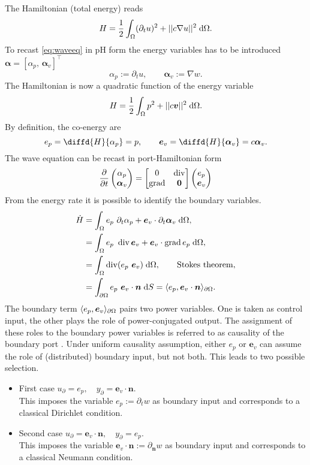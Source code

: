 The Hamiltonian (total energy) reads
\[
H = \frac{1}{2} \int_{\Omega} (\partial_t u)^2 + ||c \nabla u||^2 \d\Omega.
\]
To recast \eqref{eq:waveeq} in pH form the energy variables has to be introduced $\bm{\alpha} = [\alpha_p, \, \bm{\alpha}_v]^\top$
\[
\alpha_p := \partial_t u, \qquad \bm{\alpha}_v := \nabla w.
\] 
The Hamiltonian is now a quadratic function of the energy variable
\[
H = \frac{1}{2} \int_{\Omega} p^2 + ||c \bm{v}||^2  \d\Omega.
\]
By definition, the co-energy are 
\[
e_p = \diffd{H}{\alpha_p} = p, \qquad \bm{e}_v = \diffd{H}{\bm{\alpha}_v} = c\bm{\alpha}_v.
\]
The wave equation can be recast in port-Hamiltonian form
\[
\diffp{}{t}
\begin{pmatrix}
\alpha_p \\
\bm{\alpha}_v \\
\end{pmatrix} = 
\begin{bmatrix}
0 & \div \\
\grad & \bm{0}
\end{bmatrix}
\begin{pmatrix}
e_p \\
\bm{e}_v \\
\end{pmatrix}
\]
From the energy rate it is possible to identify the boundary variables. 
\begin{align*}
\dot{H} &= \int_{\Omega} e_p \ \partial_t \alpha_p + \bm{e}_v \cdot \partial_t \bm{\alpha}_v \d\Omega, \\
 &= \int_{\Omega} e_p \ \div \bm{e}_v + \bm{e}_v \cdot \grad e_p \d\Omega,  \\
 &= \int_{\Omega} \div(e_p \ \bm{e}_v) \d\Omega, \qquad \text{Stokes theorem}, \\
 &= \int_{\partial \Omega} e_p \ \bm{e}_v\cdot\bm{n} \d{S} = \inner[\partial\Omega]{e_p}{\bm{e}_v \cdot\bm{n}}.
\end{align*}
The boundary term $\inner[\partial\Omega]{e_p}{\bm{e}_v}$ pairs two power variables. One is taken as control input, the other plays the role of power-conjugated output. The assignment of these roles to the boundary power variables is referred to as causality of the boundary port \cite[Chapter 2]{kotyczka2019numerical}. Under uniform causality assumption, either $e_p$ or $\bm{e}_v$ can assume the role of (distributed) boundary input, but not both. This leads to two possible selection. 
\begin{itemize}
	\item {First case} ${u}_\partial = e_p, \quad {y}_\partial = \bm{e}_v \cdot\bm{n}$. \\
	This imposes the variable $e_p:= \partial_t w$ as boundary input and corresponds to a classical Dirichlet condition.
	
	\item {Second case} ${u}_\partial = \bm{e}_v \cdot\bm{n}, \quad {y}_\partial = e_p$. \\
	This imposes the variable $\bm{e}_v \cdot\bm{n}:= \partial_{\bm{n}} w$ as boundary input and corresponds to a classical Neumann condition.
\end{itemize} 


